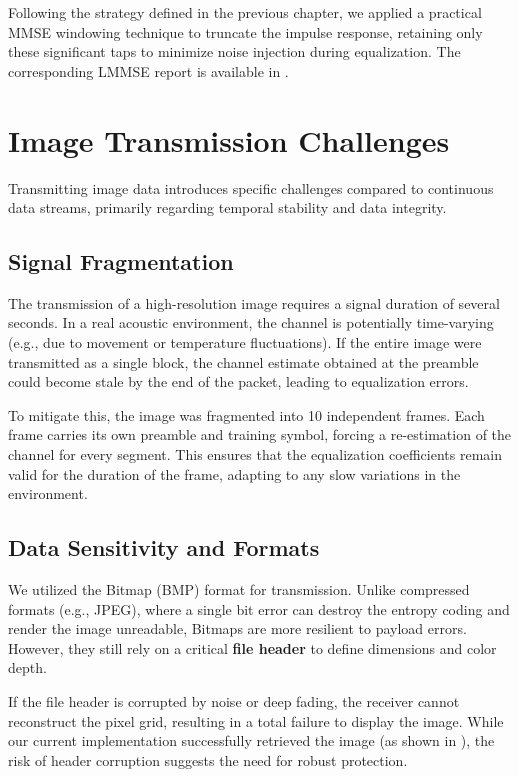 Following the strategy defined in the previous chapter, we applied a practical MMSE windowing technique to truncate the impulse response, retaining only these significant taps to minimize noise injection during equalization. The corresponding LMMSE report is available in .

\section{Image Transmission Challenges}

Transmitting image data introduces specific challenges compared to continuous data streams, primarily regarding temporal stability and data integrity.

\subsection{Signal Fragmentation}
The transmission of a high-resolution image requires a signal duration of several seconds.
In a real acoustic environment, the channel is potentially time-varying (e.g., due to movement or temperature fluctuations).
If the entire image were transmitted as a single block, the channel estimate obtained at the preamble could become stale by the end of the packet, leading to equalization errors.

To mitigate this, the image was fragmented into 10 independent frames.
Each frame carries its own preamble and training symbol, forcing a re-estimation of the channel for every segment.
This ensures that the equalization coefficients remain valid for the duration of the frame, adapting to any slow variations in the environment.

\subsection{Data Sensitivity and Formats}
We utilized the Bitmap (BMP) format for transmission.
Unlike compressed formats (e.g., JPEG), where a single bit error can destroy the entropy coding and render the image unreadable, Bitmaps are more resilient to payload errors.
However, they still rely on a critical \textbf{file header} to define dimensions and color depth.

\begin{remark}
    If the file header is corrupted by noise or deep fading, the receiver cannot reconstruct the pixel grid, resulting in a total failure to display the image.
    While our current implementation successfully retrieved the image (as shown in ), the risk of header corruption suggests the need for robust protection.
\end{remark}

